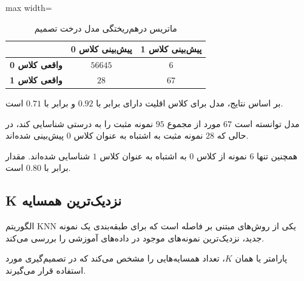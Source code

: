 \documentclass[10pt,a4paper,twocolumn]{article}
\begin{document}
\begin{table}[H]

\centering

\caption{ماتریس درهم‌ریختگی مدل درخت تصمیم}

\vspace{0.15cm}

\begin{adjustbox}{max width=\columnwidth}

\begin{tabular}{|c|c|c|}

\hline

&
\textbf{پیش‌بینی کلاس 0} &
\textbf{پیش‌بینی کلاس 1} \\

\hline

\textbf{واقعی کلاس 0} &
$56645$ &
$6$ \\

\hline

\textbf{واقعی کلاس 1} &
$28$ &
$67$ \\

\hline

\end{tabular}

\end{adjustbox}

\label{tab:dt_confusion}

\end{table}

بر اساس نتایج، مدل برای کلاس اقلیت دارای
 برابر با $0.92$ و
 برابر با $0.71$ است.

مدل توانسته است $67$ مورد از مجموع $95$ نمونه مثبت را به درستی
شناسایی کند، در حالی که $28$ نمونه مثبت به اشتباه به عنوان
کلاس $0$ پیش‌بینی شده‌اند.

همچنین تنها $6$ نمونه از کلاس $0$ به اشتباه به عنوان کلاس $1$
شناسایی شده‌اند. مقدار  برابر با $0.80$ است.


\subsection{K نزدیک‌ترین همسایه}

الگوریتم KNN یکی از روش‌های مبتنی بر فاصله است که برای
طبقه‌بندی یک نمونه جدید، نزدیک‌ترین نمونه‌های موجود در
داده‌های آموزشی را بررسی می‌کند.

پارامتر  یا همان $K$، تعداد همسایه‌هایی را
مشخص می‌کند که در تصمیم‌گیری مورد استفاده قرار می‌گیرند.
\end{document}
